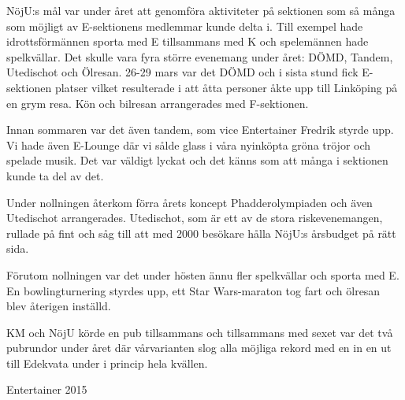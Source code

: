 \documentclass[../_main/handlingar.tex]{subfiles}
\begin{document}

NöjU:s mål var under året att genomföra aktiviteter på sektionen som så många som möjligt av E-sektionens medlemmar kunde delta i. Till exempel hade idrottsförmännen sporta med E tillsammans med K och spelemännen hade spelkvällar. Det skulle vara fyra större evenemang under året: DÖMD, Tandem, Utedischot och Ölresan. 26-29 mars var det DÖMD och i sista stund fick E-sektionen platser vilket resulterade i att åtta personer åkte upp till Linköping på en grym resa. Kön och bilresan arrangerades med F-sektionen.

Innan sommaren var det även tandem, som vice Entertainer Fredrik styrde upp. Vi hade även E-Lounge där vi sålde glass i våra nyinköpta gröna tröjor och spelade musik. Det var väldigt lyckat och det känns som att många i sektionen kunde ta del av det.

Under nollningen återkom förra årets koncept Phadderolympiaden och även Utedischot arrangerades. Utedischot, som är ett av de stora riskevenemangen, rullade på fint och såg till att med 2000 besökare hålla NöjU:s årsbudget på rätt sida.

Förutom nollningen var det under hösten ännu fler spelkvällar och sporta med E. En bowlingturnering styrdes upp, ett Star Wars-maraton tog fart och ölresan blev återigen inställd.

KM och NöjU körde en pub tillsammans och tillsammans med sexet var det två pubrundor under året där vårvarianten slog alla möjliga rekord med en in en ut till Edekvata under i princip hela kvällen.

\begin{signatures}{1}
    \mvh
    \signature{Emil Nilén}{Entertainer 2015}
\end{signatures}
\end{document}
